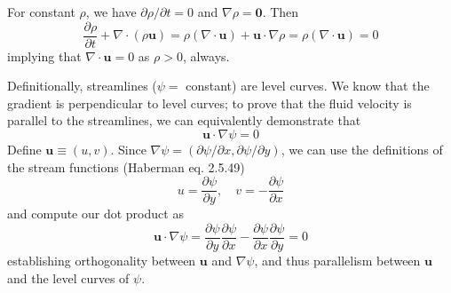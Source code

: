 \documentclass[a4paper]{article}
\begin{document}
\vspace{12pt}


For constant \( \rho \), we have \( \partial \rho / \partial t = 0 \) and \( \nabla \rho = \pmb{0} \). Then
\[
	\frac{\partial \rho}{\partial t} + \nabla \cdot \!\left( \rho \pmb{u} \right) = \rho \!\left( \nabla \cdot \pmb{u} \right) + \pmb{u} \cdot \nabla \rho = \rho \!\left( \nabla \cdot \pmb{u} \right) = 0
\]
implying that \( \nabla \cdot \pmb{u} = 0 \) as \( \rho > 0 \), always.

\vspace{12pt}


Definitionally, streamlines (\( \psi = \) constant) are level curves. We know that the gradient is perpendicular to level curves; to prove that the fluid velocity is parallel to the streamlines, we can equivalently demonstrate that
\[
	\pmb{u} \cdot \nabla \psi = 0
\]
Define \( \pmb{u} \equiv \!\left( u,v \right) \). Since \( \nabla \psi = \!\left( \partial \psi / \partial x, \partial \psi / \partial y \right) \), we can use the definitions of the stream functions (Haberman eq. 2.5.49)
\[
	u = \frac{\partial \psi}{\partial y}, \quad v = -\frac{\partial \psi}{\partial x}
\]
and compute our dot product as 
\[
	\pmb{u} \cdot \nabla \psi = \frac{\partial \psi}{\partial y}\frac{\partial \psi}{\partial x} - \frac{\partial \psi}{\partial x}\frac{\partial \psi}{\partial y} = 0 
\]
establishing orthogonality between \( \pmb{u} \) and \( \nabla \psi \), and thus parallelism between \( \pmb{u} \) and the level curves of \( \psi \).

\vspace{12pt}

\end{document}
